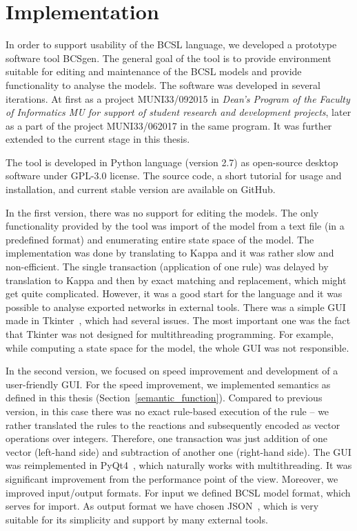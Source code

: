 \documentclass[12pt, twoside]{fithesis2} %
\begin{document}
\chapter{Implementation}
\label{implementation}

In order to support usability of the BCSL language, we developed a prototype software tool BCSgen. The general goal of the tool is to provide environment suitable for editing and maintenance of the BCSL models and provide functionality to analyse the models. The software was developed in several iterations. At first as a project MUNI33/092015 in \emph{Dean's Program of the Faculty of Informatics MU for support of student research and development projects}, later as a part of the project MUNI33/062017 in the same program. It was further extended to the current stage in this thesis.

The tool is developed in Python language (version 2.7) as open-source desktop software under GPL-3.0 license. The source code, a short tutorial for usage and installation, and current stable version are available on GitHub\footnotemark[1].

In the first version, there was no support for editing the models. The only functionality provided by the tool was import of the model from a text file (in a predefined format) and enumerating entire state space of the model. The implementation was done by translating to Kappa and it was rather slow and non-efficient. The single transaction (application of one rule) was delayed by translation to Kappa and then by exact matching and replacement, which might get quite complicated. However, it was a good start for the language and it was possible to analyse exported networks in external tools. There was a simple GUI made in Tkinter~\cite{Tkinter}, which had several issues. The most important one was the fact that Tkinter was not designed for multithreading programming. For example, while computing a state space for the model, the whole GUI was not responsible.

In the second version, we focused on speed improvement and development of a user-friendly GUI. For the speed improvement, we implemented semantics as defined in this thesis (Section~\ref{semantic_function}). Compared to previous version, in this case there was no exact rule-based execution of the rule -- we rather translated the rules to the reactions and subsequently encoded as vector operations over integers. Therefore, one transaction was just addition of one vector (left-hand side) and subtraction of another one (right-hand side). The GUI was reimplemented in PyQt4~\cite{summerfield2007rapid}, which naturally works with multithreading. It was significant improvement from the performance point of the view. Moreover, we improved input/output formats. For input we defined BCSL model format, which serves for import. As output format we have chosen JSON~\cite{json}, which is very suitable for its simplicity and support by many external tools.
\end{document}
